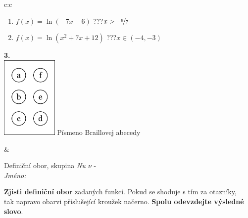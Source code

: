 \documentclass[10pt]{report}
\begin{document}
\begin{tabular}{c:c}
\begin{minipage}[c][104.5mm][t]{0.5\linewidth}
\begin{center}
\begin{minipage}{0.79\linewidth}
\begin{center}
\begin{varwidth}{\linewidth}
\begin{enumerate}
\item $f(x)=\ln{(-7x-6)}$\quad \dotfill\; ???\;\dotfill \quad $x>\nicefrac{-6}{7}$
\item $f(x)=\ln{(x^2+7x+12)}$\quad \dotfill\; ???\;\dotfill \quad $x\in(-4 , -3)$
\end{enumerate}
\end{varwidth}
\end{center}
\end{minipage}
\begin{minipage}{0.20\linewidth}
\begin{center}
{\Huge\bfseries 3.} \\[2mm]
\includegraphics[height=40mm]{../images/braille.png}
{\small Písmeno Braillovej abecedy}
\end{center}
\end{minipage}
\end{center}
\end{minipage}
&
\begin{minipage}[c][104.5mm][t]{0.5\linewidth}
\begin{center}
\vspace{7mm}
{\huge Definiční obor, skupina \textit{Nu $\nu$} -}\\[5mm]
\textit{Jméno:}\phantom{xxxxxxxxxxxxxxxxxxxxxxxxxxxxxxxxxxxxxxxxxxxxxxxxxxxxxxxxxxxxxxxxx}\\[5mm]
\begin{minipage}{0.95\linewidth}
\begin{center}
\textbf{Zjisti definiční obor} zadaných funkcí. Pokud se shoduje s tím za otazníky,\\tak napravo obarvi příslušející kroužek načerno. \textbf{Spolu odevzdejte výsledné slovo}.
\end{center}
\end{minipage}
\\[1mm]
\begin{minipage}{0.79\linewidth}
\begin{center}
\begin{varwidth}{\linewidth}
\begin{enumerate}
\normalsizerrr

\end{enumerate}
\end{varwidth}
\end{center}
\end{minipage}
\end{center}
\end{minipage}
\end{tabular}
\end{document}
